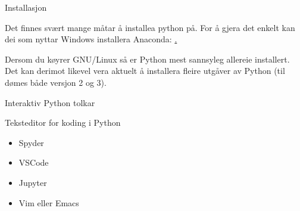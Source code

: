 \begin{frame}{Installasjon}

  Det finnes svært mange måtar å installea python på. For å gjera det enkelt kan dei som nyttar Windows installera Anaconda: \href{https://www.anaconda.com/download/}.

  Dersom du køyrer GNU/Linux så er Python mest sannsyleg allereie installert. Det kan derimot likevel vera aktuelt å installera fleire utgåver av Python (til dømes både versjon 2 og 3).
\end{frame}

\begin{frame}{Interaktiv Python tolkar}
  
\end{frame}

\begin{frame}{Teksteditor for koding i Python}

  \begin{itemize}
  \item Spyder
  \item VSCode
  \item Jupyter
    \item Vim eller Emacs
  \end{itemize}
\end{frame}

